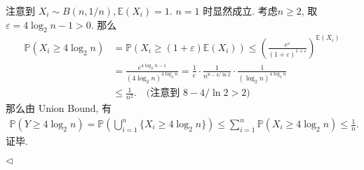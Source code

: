 \documentclass[11pt]{article}
\newenvironment{answer}[1][Solution]{\begin{trivlist}
    \item[\hskip \labelsep {\bfseries #1.}\hskip \labelsep]}{\hfill$\lhd$\end{trivlist}}
\newcommand\1{\mathds{1}}
\newcommand\E{\mathbb{E}}
\newcommand\PP{\mathbb{P}}
\begin{document}
\begin{answer}
\begin{enumerate}[label=(\arabic*)]
        注意到 $X_i \sim B(n, 1/n),\E(X_i) = 1$. $n=1$ 时显然成立. 考虑$n\ge 2$, 取 $\varepsilon  = 4\log_2 n - 1 > 0$. 那么
        \begin{align*}
            \PP(X_i \ge 4\log_2 n) &= \PP(X_i \ge (1+\varepsilon)\E(X_i)) \le \left(\frac{e^{\varepsilon}}{(1+\varepsilon)^{1+\varepsilon}}\right)^{\E(X_i)} \\
            &= \frac{e^{4\log_2 n - 1}}{(4\log_2 n)^{4\log_2 n}} = \frac{1}{e}\cdot \frac{1}{n^{8-4/\ln 2}} \cdot \frac{1}{(\log_2 n)^{4\log_2 n}} \\
            &\le \frac{1}{n^2}. \quad \text{(注意到 $8-4/\ln 2 > 2$)}
        \end{align*}
        那么由 Union Bound, 有
        \begin{align*}
            \PP(Y\ge 4\log_2 n) = \PP\left(\bigcup_{i=1}^n \{X_i \ge 4\log_2 n\}\right) \le \sum_{i=1}^n \PP(X_i \ge 4\log_2 n) \le \frac{1}{n}.
        \end{align*}
        证毕.
    \end{enumerate}
\end{answer}
\end{document}
